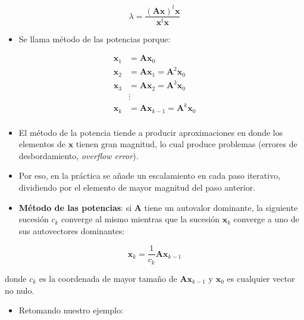 \documentclass[openany]{book}
\providecommand{\tightlist}{%
  \setlength{\itemsep}{0pt}\setlength{\parskip}{0pt}}
\begin{document}
\[
\lambda = \frac{(\textbf{Ax})^t\textbf{x}}{\textbf{x}^t\textbf{x}}
\]

\begin{itemize}
\tightlist
\item
  Se llama método de las potencias porque:
\end{itemize}

\[
\begin{aligned}
\textbf{x}_1 &= \textbf{Ax}_{0} \\
\textbf{x}_2 &= \textbf{Ax}_{1} = \textbf{A}^2 \textbf{x}_{0}\\
\textbf{x}_3 &= \textbf{Ax}_{2} = \textbf{A}^3 \textbf{x}_{0}\\
&\vdots \\
\textbf{x}_k &= \textbf{Ax}_{k-1} = \textbf{A}^k \textbf{x}_{0}\\
\end{aligned}
\]

\begin{itemize}
\item
  El método de la potencia tiende a producir aproximaciones en donde los elementos de \(\textbf{x}\) tienen gran magnitud, lo cual produce problemas (errores de desbordamiento, \emph{overflow error}).
\item
  Por eso, en la práctica se añade un escalamiento en cada paso iterativo, dividiendo por el elemento de mayor magnitud del paso anterior.
\item
  \textbf{Método de las potencias}: si \(\textbf{A}\) tiene un autovalor dominante, la siguiente sucesión \(c_k\) converge al mismo mientras que la sucesión \(\textbf{x}_k\) converge a uno de sus autovectores dominantes:
\end{itemize}

\[
\textbf{x}_k = \frac{1}{c_k} \textbf{Ax}_{k-1}
\]

donde \(c_{k}\) es la coordenada de mayor tamaño de \(\textbf{Ax}_{k-1}\) y \(\textbf{x}_0\) es cualquier vector no nulo.

\begin{itemize}
\tightlist
\item
  Retomando nuestro ejemplo:
\end{itemize}
\end{document}
